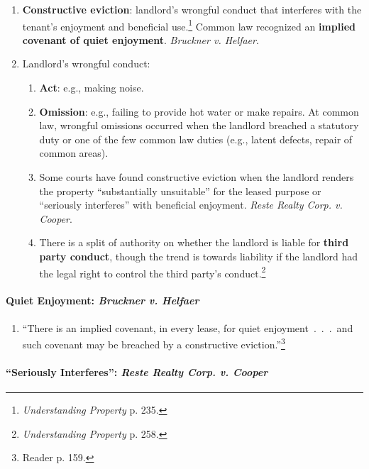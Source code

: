 \begin{enumerate}
    \item \textbf{Constructive eviction}: landlord's wrongful conduct that 
    interferes with the tenant's enjoyment and beneficial 
    use.\footnote{\emph{Understanding Property} p. 235.} Common law recognized 
    an \textbf{implied covenant of quiet enjoyment}. \emph{Bruckner v. 
    Helfaer}.
    \item Landlord's wrongful conduct:
    \begin{enumerate}
        \item \textbf{Act}: e.g., making noise.
        \item \textbf{Omission}: e.g., failing to provide hot water or make 
        repairs. At common law, wrongful omissions occurred when the landlord 
        breached a statutory duty or one of the few common law duties (e.g., 
        latent defects, repair of common areas).
        \item Some courts have found constructive eviction when the landlord 
        renders the property ``substantially unsuitable'' for the leased 
        purpose or ``seriously interferes'' with beneficial enjoyment. 
        \emph{Reste Realty Corp. v. Cooper}.
        \item There is a split of authority on whether the landlord is liable 
        for \textbf{third party conduct}, though the trend is towards 
        liability if the landlord had the legal right to control the third 
        party's conduct.\footnote{\emph{Understanding Property} p. 258.}
    \end{enumerate}
\end{enumerate}

\paragraph{Quiet Enjoyment: \emph{Bruckner v. Helfaer}}

\begin{enumerate}
    \item ``There is an implied covenant, in every lease, for quiet 
    enjoyment~.~.~.~and such covenant may be breached by a constructive 
    eviction.''\footnote{Reader p. 159.}
\end{enumerate}

\paragraph{``Seriously Interferes'': \emph{Reste Realty Corp. v. Cooper}} 

